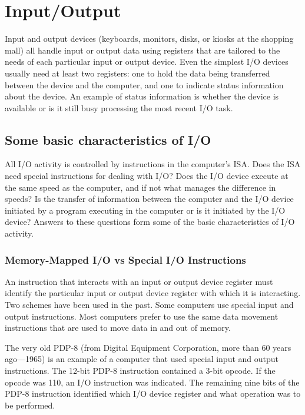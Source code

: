 \documentclass{patt}
\begin{document}
\section{Input/Output}

Input and output devices (keyboards, monitors, disks, or kiosks at the
shopping mall) all handle input or output data using registers that are 
tailored to the needs of each particular input or output device.  
Even the simplest I/O devices usually need at least two registers: one to 
hold the data being transferred between the device and the computer, and one 
to indicate status information about the device.  An example of status 
information is whether the device is available or is it still busy processing 
the most recent I/O task.

\subsection{Some basic characteristics of I/O}

All I/O activity is controlled by instructions in the computer's ISA.  Does
the ISA need special instructions for dealing with I/O?  Does the I/O device
execute at the same speed as the computer, and if not what manages the
difference in speeds?  Is the transfer of information between the
computer and the I/O device initiated by a program executing in the computer
or is it initiated by the I/O device?  Answers to these questions form some
of the basic characteristics of I/O activity.

\subsubsection{Memory-Mapped I/O vs Special I/O Instructions}

An instruction that interacts with an input or output device register
must identify the particular input or output device register with
which it is interacting. Two schemes have been used in the past.  Some
computers use special input and output instructions. Most computers
prefer to use the same data movement instructions that are used to
move data in and out of memory.

The very old PDP-8 (from Digital Equipment Corporation, more than 60 years
ago---1965) is an example of a computer that used special input and
output instructions. The 12-bit PDP-8 instruction contained a 3-bit
opcode. If the opcode was 110, an I/O instruction was indicated. The
remaining nine bits of the PDP-8 instruction identified which I/O
device register and what operation was to be performed.
\end{document}
